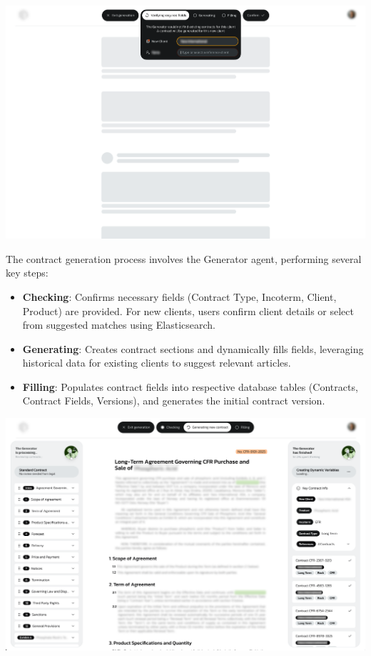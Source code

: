 \begin{center}
    \centering
    \includegraphics[width=1\textwidth]{Images/Generation Contract - Checking Required Fields.png}
    \label{fig:contract_verifying_fields_step}
\end{center}

The contract generation process involves the Generator agent, performing several key steps:

\begin{itemize}
    \item \textbf{Checking}: Confirms necessary fields (Contract Type, Incoterm, Client, Product) are provided. For new clients, users confirm client details or select from suggested matches using Elasticsearch.
    \item \textbf{Generating}: Creates contract sections and dynamically fills fields, leveraging historical data for existing clients to suggest relevant articles.
    \item \textbf{Filling}: Populates contract fields into respective database tables (Contracts, Contract Fields, Versions), and generates the initial contract version.
\end{itemize}

\begin{center}
    \centering
    \includegraphics[width=1\textwidth]{Images/Generation Contract - Steps.png}
    \label{fig:contract_generation_steps}
\end{center}

